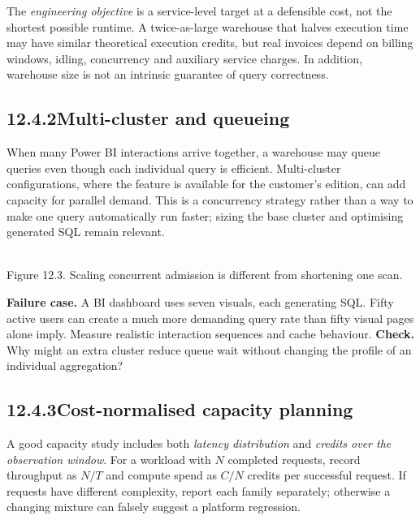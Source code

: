 \documentclass[11pt,twoside]{article}
\newcommand{\topic}[2]{\subsection*{#1\quad #2}}
\begin{document}
The \emph{engineering objective} is a service-level target at a defensible cost, not the shortest possible runtime. A twice-as-large warehouse that halves execution time may have similar theoretical execution credits, but real invoices depend on billing windows, idling, concurrency and auxiliary service charges. In addition, warehouse size is not an intrinsic guarantee of query correctness.
\topic{12.4.2}{Multi-cluster and queueing}
When many Power BI interactions arrive together, a warehouse may queue queries even though each individual query is efficient. Multi-cluster configurations, where the feature is available for the customer's edition, can add capacity for parallel demand. This is a concurrency strategy rather than a way to make one query automatically run faster; sizing the base cluster and optimising generated SQL remain relevant.
\begin{center}\\{\fontsize{8}{9}\selectfont\color{inkgray}Figure 12.3. Scaling concurrent admission is different from shortening one scan.}\end{center}
\textbf{Failure case.} A BI dashboard uses seven visuals, each generating SQL. Fifty active users can create a much more demanding query rate than fifty visual pages alone imply. Measure realistic interaction sequences and cache behaviour. \textbf{Check.} Why might an extra cluster reduce queue wait without changing the profile of an individual aggregation?
\newpage
\topic{12.4.3}{Cost-normalised capacity planning}
A good capacity study includes both \emph{latency distribution} and \emph{credits over the observation window}. For a workload with $N$ completed requests, record throughput as $N/T$ and compute spend as $C/N$ credits per successful request. If requests have different complexity, report each family separately; otherwise a changing mixture can falsely suggest a platform regression.
\end{document}
